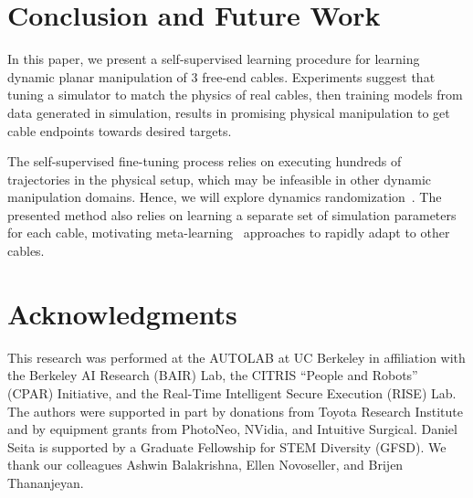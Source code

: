 \documentclass[letterpaper, 10 pt, conference]{ieeeconf}  %
\begin{document}
\section{Conclusion and Future Work}\label{sec:conclusion}

In this paper, we present a self-supervised learning procedure for learning dynamic planar manipulation of 3 free-end cables. Experiments suggest that tuning a simulator to match the physics of real cables, then training models from data generated in simulation, results in promising physical manipulation to get cable endpoints towards desired targets.

The self-supervised fine-tuning process relies on executing hundreds of trajectories in the physical setup, which may be infeasible in other dynamic manipulation domains. Hence, we will explore dynamics randomization~\cite{dynamics_randomization_2018}. The presented method also relies on learning a separate set of simulation parameters for each cable, motivating meta-learning~\cite{maml} approaches to rapidly adapt to other cables.

\section*{Acknowledgments}

{\footnotesize
This research was performed at the AUTOLAB at UC Berkeley in affiliation with the Berkeley AI Research (BAIR) Lab, the CITRIS ``People and Robots'' (CPAR) Initiative, and the Real-Time Intelligent Secure Execution (RISE) Lab. The authors were supported in part by donations from Toyota Research Institute and by equipment grants from PhotoNeo, NVidia, and Intuitive Surgical. Daniel Seita is supported by a Graduate Fellowship for STEM Diversity (GFSD). We thank our colleagues Ashwin Balakrishna, Ellen Novoseller, and Brijen Thananjeyan.
}





\normalsize
\cleardoublepage
\appendices
\end{document}
